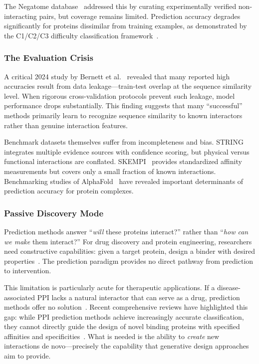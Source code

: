 The Negatome database~\cite{blohm2014negatome2} addressed this by curating experimentally verified non-interacting pairs, but coverage remains limited. Prediction accuracy degrades significantly for proteins dissimilar from training examples, as demonstrated by the C1/C2/C3 difficulty classification framework~\cite{park2015ppi}.

\subsubsection{The Evaluation Crisis}

A critical 2024 study by Bernett et al.~\cite{bernett2024bias} revealed that many reported high accuracies result from data leakage---train-test overlap at the sequence similarity level. When rigorous cross-validation protocols prevent such leakage, model performance drops substantially. This finding suggests that many ``successful'' methods primarily learn to recognize sequence similarity to known interactors rather than genuine interaction features.

Benchmark datasets themselves suffer from incompleteness and bias. STRING~\cite{szklarczyk2021string} integrates multiple evidence sources with confidence scoring, but physical versus functional interactions are conflated. SKEMPI~\cite{jankauskaite2019skempi2} provides standardized affinity measurements but covers only a small fraction of known interactions. Benchmarking studies of AlphaFold~\cite{bryant2022benchmarking} have revealed important determinants of prediction accuracy for protein complexes.

\subsubsection{Passive Discovery Mode}

Prediction methods answer ``\textit{will} these proteins interact?'' rather than ``\textit{how can we make} them interact?'' For drug discovery and protein engineering, researchers need constructive capabilities: given a target protein, design a binder with desired properties~\cite{trepte2024ai}. The prediction paradigm provides no direct pathway from prediction to intervention.

This limitation is particularly acute for therapeutic applications. If a disease-associated PPI lacks a natural interactor that can serve as a drug, prediction methods offer no solution~\cite{feng2022frameworks}. Recent comprehensive reviews have highlighted this gap: while PPI prediction methods achieve increasingly accurate classification, they cannot directly guide the design of novel binding proteins with specified affinities and specificities~\cite{kewalramani2023state}. What is needed is the ability to \textit{create} new interactions de novo---precisely the capability that generative design approaches aim to provide.

